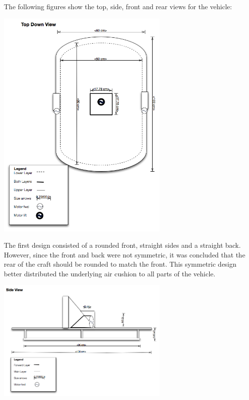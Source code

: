 The following figures show the top, side, front and rear views for the vehicle:

\begin{minipage}{6.5in}
  \begin{center}
    \includegraphics[width=85mm]{imageSources/topDownView.png}
  \end{center}
  \label{topDownView}
\end{minipage}

The first design consisted of a rounded front, straight sides and a straight back. However, since the front and back were not symmetric, it was concluded that the rear of the craft should be rounded to match the front. This symmetric design better distributed the underlying air cushion to all parts of the vehicle.

  \begin{minipage}{6.5in}
  \begin{center}
    \includegraphics[width=85mm]{imageSources/sideView.png}
  \end{center}
  \label{sideView}
  \end{minipage}

